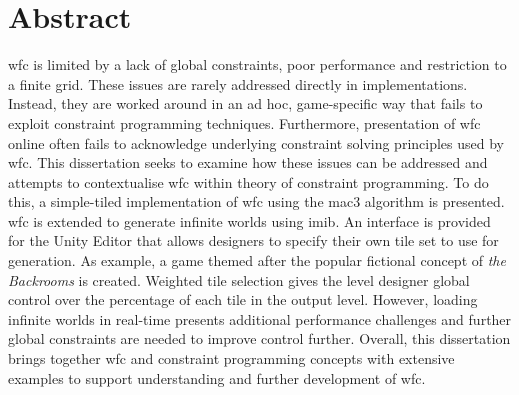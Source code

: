 \section*{Abstract}
\acrfull{wfc} is limited by a lack of global constraints, poor performance and restriction to a finite grid. These issues are rarely addressed directly in implementations. Instead, they are worked around in an ad hoc, game-specific way that fails to exploit constraint programming techniques. Furthermore, presentation of \acrshort{wfc} online often fails to acknowledge underlying constraint solving principles used by \acrshort{wfc}. This dissertation seeks to examine how these issues can be addressed and attempts to contextualise \acrshort{wfc} within theory of constraint programming. To do this, a simple-tiled implementation of \acrshort{wfc} using the \acrfull{mac3} algorithm is presented. \acrshort{wfc} is extended to generate infinite worlds using \acrfull{imib}. An interface is provided for the Unity Editor that allows designers to specify their own tile set to use for generation. As example, a game themed after the popular fictional concept of \textit{the Backrooms} is created. Weighted tile selection gives the level designer global control over the percentage of each tile in the output level. However, loading infinite worlds in real-time presents additional performance challenges and further global constraints are needed to improve control further. Overall, this dissertation brings together \acrshort{wfc} and constraint programming concepts with extensive examples to support understanding and further development of \acrshort{wfc}.


